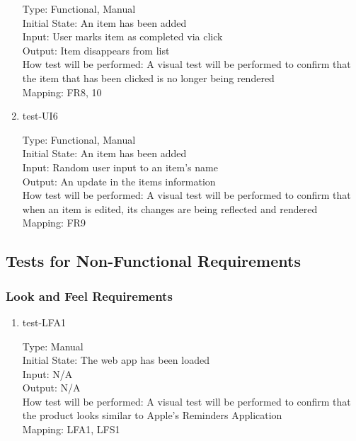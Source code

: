 \documentclass[12pt, titlepage]{article}
\begin{document}
\begin{enumerate}
Type: Functional, Manual\\
Initial State: An item has been added\\
Input: User marks item as completed via click\\
Output: Item disappears from list\\
How test will be performed: A visual test will be performed to confirm that the item that has been clicked is no longer being rendered\\
Mapping: FR8, 10

\item{test-UI6\\}

Type: Functional, Manual\\
Initial State: An item has been added\\
Input: Random user input to an item’s name\\
Output: An update in the items information\\
How test will be performed: A visual test will be performed to confirm that when an item is edited, its changes are being reflected and rendered\\
Mapping: FR9

\end{enumerate}

\subsection{Tests for Non-Functional Requirements}

\subsubsection{Look and Feel Requirements}

\begin{enumerate}
\item {test-LFA1\\}

Type: Manual\\
Initial State: The web app has been loaded\\
Input: N/A\\
Output: N/A\\
How test will be performed: A visual test will be performed to confirm that the product looks similar to Apple’s Reminders Application\\
Mapping: LFA1, LFS1

\end{enumerate}
\end{document}
